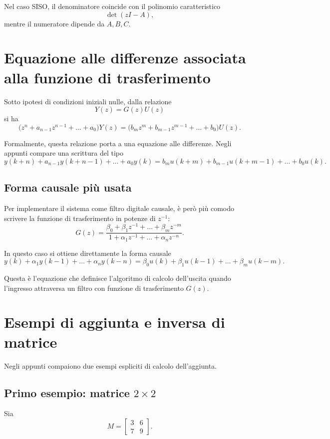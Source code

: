 Nel caso SISO, il denominatore coincide con il polinomio caratteristico
\[
\det(zI-A),
\]
mentre il numeratore dipende da \(A,B,C\).

\section{Equazione alle differenze associata alla funzione di trasferimento}

Sotto ipotesi di condizioni iniziali nulle, dalla relazione
\[
Y(z)=G(z)U(z)
\]
si ha
\[
\bigl(z^n+a_{n-1}z^{n-1}+\dots+a_0\bigr)Y(z)
=
\bigl(b_m z^m+b_{m-1}z^{m-1}+\dots+b_0\bigr)U(z).
\]

Formalmente, questa relazione porta a una equazione alle differenze.
Negli appunti compare una scrittura del tipo
\[
y(k+n)+a_{n-1}y(k+n-1)+\dots+a_0y(k)
=
b_m u(k+m)+b_{m-1}u(k+m-1)+\dots+b_0u(k).
\]

\subsection*{Forma causale pi\`u usata}

Per implementare il sistema come filtro digitale causale, \`e per\`o pi\`u comodo
scrivere la funzione di trasferimento in potenze di \(z^{-1}\):
\[
G(z)=
\frac{\beta_0+\beta_1 z^{-1}+\dots+\beta_m z^{-m}}
{1+\alpha_1 z^{-1}+\dots+\alpha_n z^{-n}}.
\]

In questo caso si ottiene direttamente la forma causale
\[
y(k)+\alpha_1 y(k-1)+\dots+\alpha_n y(k-n)
=
\beta_0 u(k)+\beta_1 u(k-1)+\dots+\beta_m u(k-m).
\]

Questa \`e l'equazione che definisce l'algoritmo di calcolo dell'uscita
quando l'ingresso attraversa un filtro con funzione di trasferimento \(G(z)\).

\section{Esempi di aggiunta e inversa di matrice}

Negli appunti compaiono due esempi espliciti di calcolo dell'aggiunta.

\subsection{Primo esempio: matrice \(2\times 2\)}

Sia
\[
M=
\begin{bmatrix}
3 & 6\\
7 & 9
\end{bmatrix}.
\]

